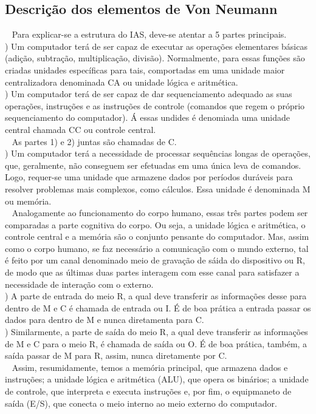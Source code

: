 \documentclass{article}
\begin{document}
		\subsection{Descrição dos elementos de Von Neumann}
			\begin{flushleft}
				~ \qquad Para explicar-se a estrutura do IAS, deve-se atentar a 5 partes principais. \\
 				) Um computador terá de ser capaz de executar as operações elementares básicas (adição, subtração, multiplicação, divisão). Normalmente, para essas funções são criadas unidades específicas para tais, comportadas em uma unidade maior centralizadora denominada CA ou unidade lógica e aritmética. \\
				) Um computador terá de ser capaz de dar sequenciamento adequado as suas operações, instruções e as instruções de controle (comandos que regem o próprio sequenciamento do computador). Á essas undides é denomiada uma unidade central chamada CC ou controle central. \\

				~ \qquad As partes 1) e 2) juntas são chamadas de C. \\

 				) Um computador terá a necessidade de processar sequências longas de operações, que, geralmente, não conseguem ser efetuadas em uma única leva de comandos. Logo, requer-se uma unidade que armazene dados por períodos duráveis para resolver problemas mais complexos, como cálculos.
Essa unidade é denominada M ou memória. \\

				~ \qquad Analogamente ao funcionamento do corpo humano, essas três partes podem ser comparadas a parte cognitiva do corpo. Ou seja, a unidade lógica e aritmética, o controle central e a memória são o conjunto pensante do computador. Mas, assim como o corpo humano, se faz necessário a comunicação com o mundo externo, tal é feito por um canal denominado meio de gravação de sáida do dispositivo ou R, de modo que as últimas duas partes interagem com esse canal para satisfazer a necessidade de interação com o externo. \\

				) A parte de entrada do meio R, a qual deve transferir as informações desse para dentro de M e C é chamada de entrada ou I. É de boa prática a entrada passar os dados para dentro de M e nunca diretamenta para C. \\
		
				) 	Similarmente, a parte de saída do meio R, a qual deve transferir as informações de M e C para o meio R, é chamada de saída ou O. É de boa prática, também, a saída passar de M para R, assim, nunca diretamente por C. \\

				~ \qquad Assim, resumidamente, temos a memória principal, que armazena dados e instruções; a unidade lógica e aritmética (ALU), que opera os binários; a unidade de controle, que interpreta e executa instruções e, por fim, o equipmaneto de saída (E/S), que conecta o meio interno ao meio externo do computador.

			
			\end{flushleft}
\end{document}

